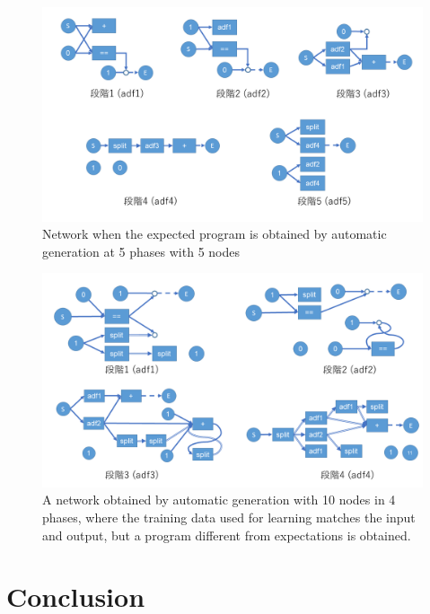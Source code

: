 \documentclass{article}
\begin{document}
\begin{figure}[t]
\begin{center}
\includegraphics[width=150mm]{out_net_p5n5.png}
\end{center}
\caption {Network when the expected program is obtained by automatic generation at 5 phases with 5 nodes}
\label{fig:out_net_p5n5}
\end{figure}
\begin{figure}[t]
\begin{center}
\includegraphics[width=150mm]{out_net_p4n10.png}
\end{center}
\caption {A network obtained by automatic generation with 10 nodes in 4 phases, where the training data used for learning matches the input and output, but a program different from expectations is obtained.}
\label{fig:out_net_p4n10}
\end{figure}

\section {Conclusion}
\end{document}

